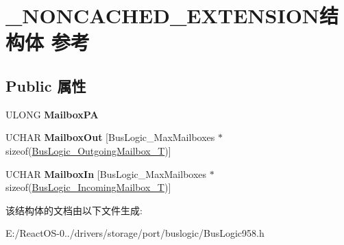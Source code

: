 \hypertarget{struct___n_o_n_c_a_c_h_e_d___e_x_t_e_n_s_i_o_n}{}\section{\+\_\+\+N\+O\+N\+C\+A\+C\+H\+E\+D\+\_\+\+E\+X\+T\+E\+N\+S\+I\+O\+N结构体 参考}
\label{struct___n_o_n_c_a_c_h_e_d___e_x_t_e_n_s_i_o_n}
\subsection*{Public 属性}
\begin{DoxyCompactItemize}
\item 
\mbox{\label{struct___n_o_n_c_a_c_h_e_d___e_x_t_e_n_s_i_o_n_a7779e944ac0b5893683578f3393bbea8}} 
U\+L\+O\+NG {\bfseries Mailbox\+PA}
\item 
\mbox{\label{struct___n_o_n_c_a_c_h_e_d___e_x_t_e_n_s_i_o_n_ad592520c83e6443ff6621de1673f4349}} 
U\+C\+H\+AR {\bfseries Mailbox\+Out} \mbox{[}Bus\+Logic\+\_\+\+Max\+Mailboxes $\ast$sizeof(\hyperlink{struct_bus_logic___outgoing_mailbox}{Bus\+Logic\+\_\+\+Outgoing\+Mailbox\+\_\+T})\mbox{]}
\item 
\mbox{\label{struct___n_o_n_c_a_c_h_e_d___e_x_t_e_n_s_i_o_n_a11022c38d5816d55f1c8895a6e1bebba}} 
U\+C\+H\+AR {\bfseries Mailbox\+In} \mbox{[}Bus\+Logic\+\_\+\+Max\+Mailboxes $\ast$sizeof(\hyperlink{struct_bus_logic___incoming_mailbox}{Bus\+Logic\+\_\+\+Incoming\+Mailbox\+\_\+T})\mbox{]}
\end{DoxyCompactItemize}


该结构体的文档由以下文件生成\+:\begin{DoxyCompactItemize}
\item 
E\+:/\+React\+O\+S-\/0../drivers/storage/port/buslogic/Bus\+Logic958.\+h\end{DoxyCompactItemize}
